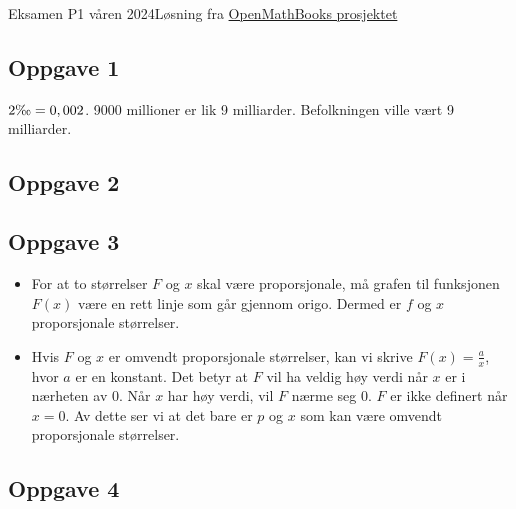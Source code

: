 





{\Large Eksamen P1 våren 2024\hfill {\footnotesize Løsning fra \color{blue} \href{https://sindreheggen.wordpress.com/}{OpenMathBooks prosjektet}}}	
\subsection*{Oppgave 1}
$ 2\text{\textperthousand}=0,002 $.
9000 millioner er lik 9 milliarder. Befolkningen ville vært 9 milliarder.

\subsection*{Oppgave 2}

\subsection*{Oppgave 3}
\begin{itemize}
	\item For at to størrelser $ F $ og $ x $ skal være proporsjonale, må grafen til funksjonen $ F(x) $ være en rett linje som går gjennom origo. Dermed er $ f $ og $ x $ proporsjonale størrelser.
	\item Hvis $ F $ og $ x $ er omvendt proporsjonale størrelser, kan vi skrive $ F(x)=\frac{a}{x} $, hvor $ a $ er en konstant. Det betyr at $ F $ vil ha veldig høy verdi når $ x $ er i nærheten av 0. Når $ x $ har høy verdi, vil $ F $ nærme seg 0. $ F $ er ikke definert når $ x=0 $. Av dette ser vi at det bare er $ p $ og $ x $ som kan være omvendt proporsjonale størrelser.
\end{itemize}

\newpage
\subsection*{Oppgave 4}


